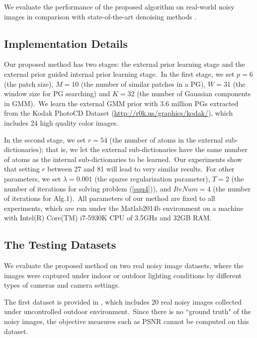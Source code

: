 \documentclass[10pt,twocolumn,letterpaper]{article}
\begin{document}
We evaluate the performance of the proposed algorithm on real-world noisy images \cite{crosschannel2016,ncwebsite}  in comparison with  state-of-the-art denoising methods \cite{bm3d,cbm3d,mlp,wnnm,csf,chen2015learning,crosschannel2016,noiseclinic,ncwebsite,neatimage}.


\subsection{Implementation Details}\vspace{-1mm}

Our proposed method has two stages: the external prior learning stage and the external prior guided internal prior learning stage.\ In the first stage, we set $p = 6$ (the patch size), $M = 10$ (the number of similar patches in a PG), $W = 31$ (the window size for PG searching) and $K = 32$ (the number of Gaussian components in GMM).\ We learn the external GMM prior with 3.6 million PGs extracted from the Kodak PhotoCD Dataset (\url{http://r0k.us/graphics/kodak/}), which includes 24 high quality color images. 

In the second stage, we set $r = 54$ (the number of atoms in the external sub-dictionaries); that is, we let the external sub-dictionaries have the same number of atoms as the internal sub-dictionaries to be learned.\ Our experiments show that setting $r$ between 27 and 81 will lead to very similar results.\ For other parameters, we set $\lambda=0.001$ (the sparse regularization parameter), $T = 2$ (the number of iterations for solving problem (\ref{equ4})), and $IteNum = 4$ (the number of iterations for Alg.1).\ All parameters of our method are fixed to all experiments, which are run under the Matlab2014b environment on a machine with Intel(R) Core(TM) i7-5930K CPU of 3.5GHz and 32GB RAM.


\subsection{The Testing Datasets}\vspace{-1mm}

We evaluate the proposed method on two real noisy image datasets, where the images were captured under indoor or outdoor lighting conditions by different types of cameras and camera settings. 

The first dataset is provided in \cite{ncwebsite}, which includes 20 real noisy images collected under uncontrolled outdoor environment.\ Since there is no ``ground truth" of the noisy images, the objective measures such as PSNR cannot be computed on this dataset. 
\end{document}
